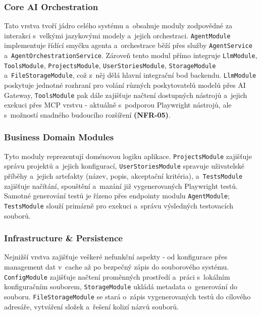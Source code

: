 \documentclass[czech, ing, kiv, he, iso690numb, viewonly]{fasthesis}
\begin{document}
\subsubsection*{Core AI Orchestration}
Tato vrstva tvoří jádro celého systému a~obsahuje moduly zodpovědné za interakci s~velkými jazykovými modely a~jejich orchestraci.
\texttt{AgentModule} implementuje řídící smyčku agenta a~orchestrace běží přes služby \texttt{AgentService} a~\texttt{AgentOrchestrationService}.
Zároveň tento modul přímo integruje \texttt{LlmModule}, \texttt{ToolsModule}, \texttt{ProjectsModule}, \texttt{UserStoriesModule}, \texttt{StorageModule} a~\texttt{FileStorageModule},
což z~něj dělá hlavní integrační bod backendu.
\texttt{LlmModule} poskytuje jednotné rozhraní pro volání různých poskytovatelů modelů přes AI Gateway,
\texttt{ToolsModule} pak dále zajišťuje načtení dostupných nástrojů a~jejich exekuci přes MCP vrstvu - aktuálně s~podporou Playwright nástrojů, ale
s~možností snadného budoucího rozšíření \textbf{(NFR-05)}.

\subsubsection*{Business Domain Modules}
Tyto moduly reprezentují doménovou logiku aplikace. \texttt{ProjectsModule} zajišťuje správu projektů a~jejich konfigurací,
\texttt{UserStoriesModule} spravuje uživatelské příběhy a~jejich artefakty (název, popis, akceptační kritéria), 
a~\texttt{TestsModule} zajišťuje načítání, spouštění a~mazání již vygenerovaných Playwright testů.
Samotné generování testů je řízeno přes endpointy modulu \texttt{AgentModule}; \texttt{TestsModule} slouží primárně pro exekuci a~správu výsledných testovacích souborů.

\subsubsection*{Infrastructure \& Persistence}
Nejnižší vrstva zajišťuje veškeré nefunkční aspekty - od konfigurace přes management dat v~cache až po bezpečný zápis do souborového systému.
\texttt{ConfigModule} zajišťuje načtení proměnných prostředí a~práci s~lokálním konfiguračním souborem,
\texttt{StorageModule} ukládá metadata o~generování do souboru.
\texttt{FileStorageModule} se stará o~zápis vygenerovaných testů do cílového adresáře, vytváření složek a~řešení kolizí názvů souborů.
\end{document}
